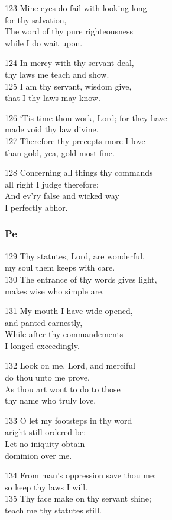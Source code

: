 \begin{multicols}{3}
123 Mine eyes do fail with looking long\\
for thy salvation,\\
The word of thy pure righteousness\\
while I do wait upon.

124 In mercy with thy servant deal,\\
thy laws me teach and show.\\
125 I am thy servant, wisdom give,\\
that I thy laws may know.

126 ‘Tis time thou work, Lord; for they have\\
made void thy law divine.\\
127 Therefore thy precepts more I love\\
than gold, yea, gold most fine.

128 Concerning all things thy commands\\
all right I judge therefore;\\
And ev’ry false and wicked way\\
I perfectly abhor.


\subsubsection*{Pe}

129 Thy statutes, Lord, are wonderful,\\
my soul them keeps with care.\\
130 The entrance of thy words gives light,\\
makes wise who simple are.

131 My mouth I have wide opened,\\
and panted earnestly,\\
While after thy commandements\\
I longed exceedingly.

132 Look on me, Lord, and merciful\\
do thou unto me prove,\\
As thou art wont to do to those\\
thy name who truly love.

133 O let my footsteps in thy word\\
aright still ordered be:\\
Let no iniquity obtain\\
dominion over me.

134 From man’s oppression save thou me;\\
so keep thy laws I will.\\
135 Thy face make on thy servant shine;\\
teach me thy statutes still.


\end{multicols}
